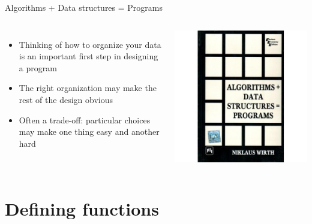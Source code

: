 \documentclass[aspectratio=169,usenames,dvipsnames]{beamer}
\begin{document}
\begin{frame}{Algorithms + Data structures = Programs}
    \begin{columns}
            \begin{itemize}
                \item Thinking of how to organize your data is an important
                    first step in designing a program
                \item The right organization may make the rest of the design
                    obvious
                \item Often a trade-off: particular choices may make one thing
                    easy and another hard
            \end{itemize}
            \includegraphics[height=0.8\textheight]{fig/wirth}
    \end{columns}
\end{frame}




\section{Defining functions}
\frame{\tableofcontents[currentsection]}
\end{document}
